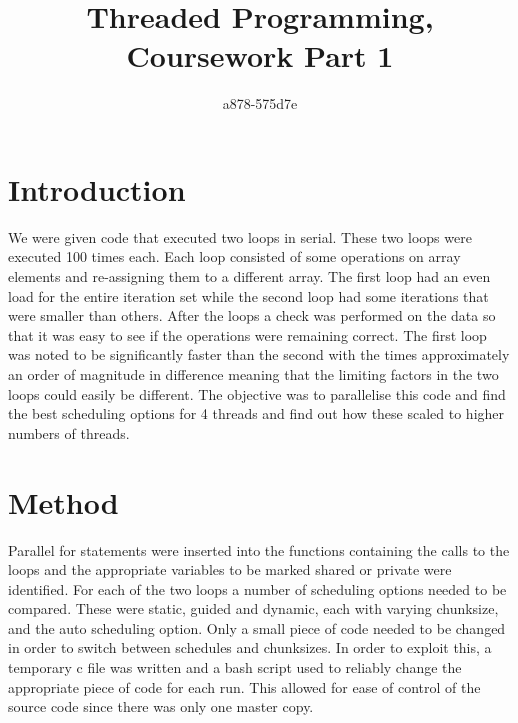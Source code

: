 \documentclass[12pt]{article}    %
\title{Threaded Programming, Coursework Part 1}  %
\author{a878-575d7e}    %
\date{}   %
\numberwithin{equation}{section}
\begin{document}

\maketitle                 %
\begin{center}

\clearpage
{}
\end{center}

\section{Introduction}
We were given code that executed two loops in serial.
These two loops were executed 100 times each.
Each loop consisted of some operations on array elements and re-assigning them to a different array.
The first loop had an even load for the entire iteration set while the second loop had some iterations that were smaller than others.
After the loops a check was performed on the data so that it was easy to see if the operations were remaining correct.
The first loop was noted to be significantly faster than the second with the times approximately an order of magnitude in difference meaning that the limiting factors in the two loops could easily be different.
The objective was to parallelise this code and find the best scheduling options for 4 threads and find out how these scaled to higher numbers of threads.\\

\section{Method}
Parallel for statements were inserted into the functions containing the calls to the loops and the appropriate variables to be marked shared or private were identified.
For each of the two loops a number of scheduling options needed to be compared.
These were static, guided and dynamic, each with varying chunksize, and the auto scheduling option.
Only a small piece of code needed to be changed in order to switch between schedules and chunksizes.
In order to exploit this, a temporary c file was written and a bash script used to reliably change the appropriate piece of code for each run.
This allowed for ease of control of the source code since there was only one master copy.\\
\end{document}
